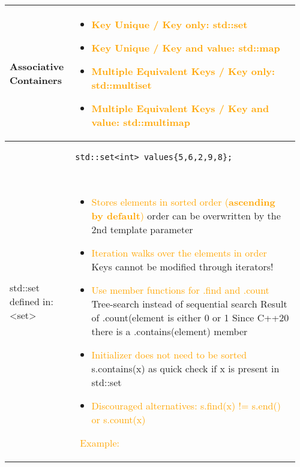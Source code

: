 \documentclass[main.tex,fontsize=8pt,paper=a4,paper=portrait,DIV=calc,]{scrartcl}
\begin{document}
\begin{table}[ht!]
\begin{tabular}{|m{0.2\linewidth}|m{0.755\linewidth}|}
\hline
Associative Containers & 
\vspace{2mm}
\begin{itemize}
\item \textcolor{Orange}{Key Unique / Key only: std::set}
\item \textcolor{Orange}{Key Unique / Key and value: std::map}
\item \textcolor{Orange}{Multiple Equivalent Keys / Key only: std::multiset}
\item \textcolor{Orange}{Multiple Equivalent Keys / Key and value: std::multimap}
\vspace{-2mm}
\end{itemize}\\ 
\hline
std::set \newline 
defined in: <set> &
\begin{lstlisting}
std::set<int> values{5,6,2,9,8};
\end{lstlisting}
\, \newline
\begin{itemize}
\item \textcolor{orange}{Stores elements in sorted order (\textbf{ascending by default})}\newline
  order can be overwritten by the 2nd template parameter
\item \textcolor{orange}{Iteration walks over the elements in order}\newline
  Keys cannot be modified through iterators!
\item \textcolor{orange}{Use member functions for .find and .count}\newline
  Tree-search instead of sequential search\newline
  Result of .count(element is either 0 or 1\newline
  Since C++20 there is a .contains(element) member
\item \textcolor{orange}{Initializer does not need to be sorted}\newline
  s.contains(x) as quick check if x is present in std::set
\item \textcolor{orange}{Discouraged alternatives: s.find(x) != s.end() or s.count(x)}
\vspace{-2mm}
\end{itemize} 
\, \newline
\textcolor{orange}{Example:}\newline

\end{tabular}
\end{table}
\end{document}
